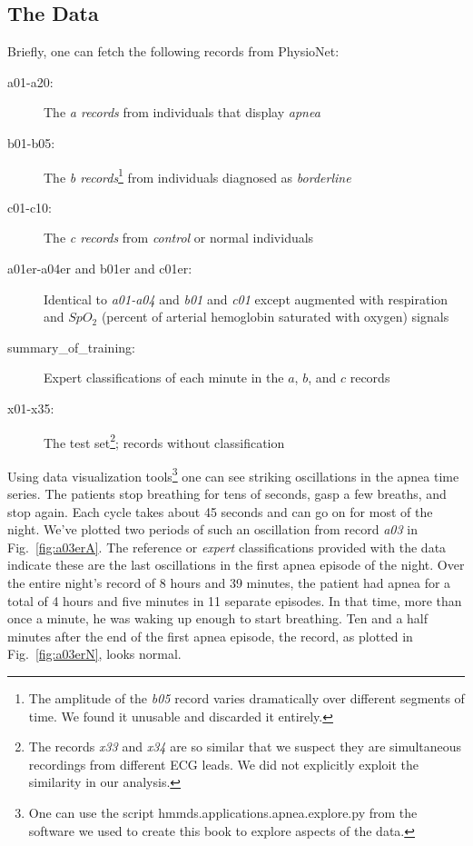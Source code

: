 \subsection{The Data}
\label{sec:data}

Briefly, one can fetch the following records from PhysioNet:
\begin{description}
\item[a01-a20:] The \emph{a records} from individuals that display
  \emph{apnea}
\item[b01-b05:] The \emph{b records}\footnote{The amplitude of the
    \emph{b05} record varies dramatically over different segments of
    time.  We found it unusable and discarded it entirely.} from
  individuals diagnosed as \emph{borderline}
\item[c01-c10:] The \emph{c records} from \emph{control} or normal
  individuals
\item[a01er-a04er and b01er and c01er:] Identical to \emph{a01-a04}
  and \emph{b01} and \emph{c01} except augmented with respiration and
  $SpO_2$ (percent of arterial hemoglobin saturated with oxygen)
   signals
\item[summary\_of\_training:] Expert classifications of each minute in
  the $a$, $b$, and $c$ records
\item[x01-x35:] The test set\footnote{The records \emph{x33} and
    \emph{x34} are so similar that we suspect they are simultaneous
    recordings from different ECG leads.  We did not explicitly exploit
  the similarity in our analysis.}; records without classification
\end{description}

Using data visualization tools\footnote{One can use the script
  hmmds.applications.apnea.explore.py from the software we used to
  create this book to explore aspects of the data.} one can see
striking oscillations in the apnea time series.  The patients stop
breathing for tens of seconds, gasp a few breaths, and stop again.
Each cycle takes about 45 seconds and can go on for most of the night.
We've plotted two periods of such an oscillation from record \emph{a03}
in Fig.~\ref{fig:a03erA}.  The reference or \emph{expert}
classifications provided with the data indicate these are the last
oscillations in the first apnea episode of the night.  Over the entire
night's record of 8 hours and 39 minutes, the patient had apnea for a
total of 4 hours and five minutes in 11 separate episodes.  In that
time, more than once a minute, he was waking up enough to start
breathing.  Ten and a half minutes after the end of the first apnea
episode, the record, as plotted in Fig.~\ref{fig:a03erN}, looks
normal.


